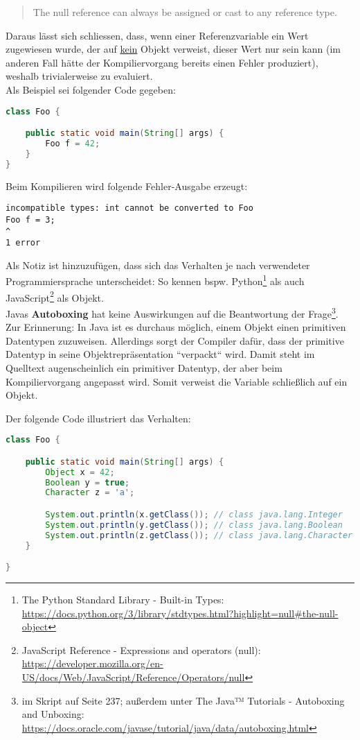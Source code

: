\blockquote{
    The null reference can always be assigned or cast to any reference type.
}

Daraus lässt sich schliessen, dass, wenn einer Referenzvariable ein Wert zugewiesen wurde, der auf \underline{kein} Objekt verweist,
dieser Wert nur  sein kann (im anderen Fall hätte der Kompiliervorgang bereits einen Fehler produziert),
weshalb  trivialerweise zu  evaluiert.\\

Als Beispiel sei folgender Code gegeben:
\begin{lstlisting}[language=java]
class Foo {

    public static void main(String[] args) {
        Foo f = 42;
    }
}
\end{lstlisting}

Beim Kompilieren wird folgende Fehler-Ausgabe erzeugt:

\begin{lstlisting}[language=text]
incompatible types: int cannot be converted to Foo
Foo f = 3;
^
1 error
\end{lstlisting}

Als Notiz ist hinzuzufügen, dass sich das Verhalten je nach verwendeter Programmiersprache unterscheidet: So kennen
bspw. Python\footnote{
    The Python Standard Library - Built-in Types: \url{https://docs.python.org/3/library/stdtypes.html?highlight=null#the-null-object}
} als auch JavaScript\footnote{
    JavaScript Reference - Expressions and operators (null): \url{https://developer.mozilla.org/en-US/docs/Web/JavaScript/Reference/Operators/null}
}  als Objekt.\\

Javas \textbf{Autoboxing} hat keine Auswirkungen auf die Beantwortung der Frage\footnote{
    im Skript auf Seite 237; außerdem unter
    The Java™ Tutorials - Autoboxing and Unboxing: \url{https://docs.oracle.com/javase/tutorial/java/data/autoboxing.html}
}.
Zur Erinnerung: In Java ist es durchaus möglich, einem Objekt einen primitiven Datentypen zuzuweisen.
Allerdings sorgt der Compiler dafür, dass der primitive Datentyp in seine Objektrepräsentation ``verpackt`` wird.
Damit steht im Quelltext augenscheinlich ein primitiver Datentyp, der aber beim Kompiliervorgang angepasst wird.
Somit verweist die Variable schließlich auf  ein Objekt.

Der folgende Code illustriert das Verhalten:

\begin{lstlisting}[language=java]
class Foo {

    public static void main(String[] args) {
        Object x = 42;
        Boolean y = true;
        Character z = 'a';

        System.out.println(x.getClass()); // class java.lang.Integer
        System.out.println(y.getClass()); // class java.lang.Boolean
        System.out.println(z.getClass()); // class java.lang.Character
    }

}
\end{lstlisting}

